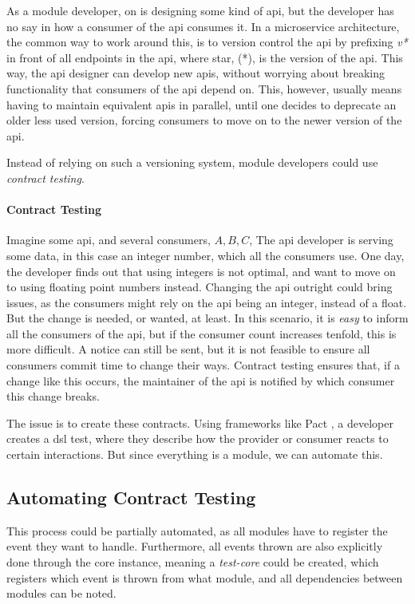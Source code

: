 As a module developer, on is designing some kind of \gls{api}, but the developer
has no say in how a consumer of the \gls{api} consumes it. In a microservice
architecture, the common way to work around this, is to version control the
\gls{api} by prefixing \textit{v*} in front of all endpoints in the \gls{api},
where star, (*), is the version of the \gls{api}. This way, the \gls{api}
designer can develop new \gls{api}s, without worrying about breaking
functionality that consumers of the \gls{api} depend on. This, however, usually
means having to maintain equivalent \gls{api}s in parallel, until one decides
to deprecate an older less used version, forcing consumers to move on to the
newer version of the \gls{api}.

Instead of relying on such a versioning system, module developers could use
\textit{contract testing}.

\paragraph{Contract Testing} Imagine some \gls{api}, and several consumers,
$A, B, C$, The \gls{api} developer is serving some data, in this case an
integer number, which all the consumers use. One day, the developer finds out
that using integers is not optimal, and want to move on to using floating point
numbers instead. Changing the \gls{api} outright could bring issues, as the
consumers might rely on the \gls{api} being an integer, instead of a float. But
the change is needed, or wanted, at least. In this scenario, it is \textit{easy}
to inform all the consumers of the \gls{api}, but if the consumer count
increases tenfold, this is more difficult. A notice can still be sent, but it is
not feasible to ensure all consumers commit time to change their ways. Contract
testing ensures that, if a change like this occurs, the maintainer of the
\gls{api} is notified by which consumer this change breaks.

The issue is to create these contracts. Using frameworks like Pact \cite{pact},
a developer creates a \gls{dsl} test, where they describe how the provider or
consumer reacts to certain interactions. But since everything is a module, we
can automate this.

\subsection{Automating Contract Testing}

This process could be partially automated, as all modules have to register the
event they want to handle. Furthermore, all events thrown are also explicitly
done through the core instance, meaning a \textit{test-core} could be created,
which registers which event is thrown from what module, and all dependencies
between modules can be noted.

